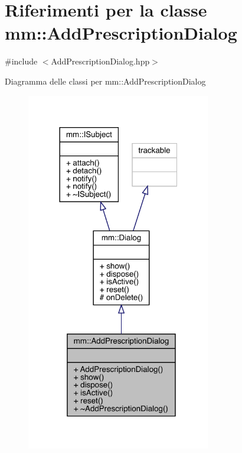 \hypertarget{classmm_1_1_add_prescription_dialog}{}\section{Riferimenti per la classe mm\+:\+:Add\+Prescription\+Dialog}
\label{classmm_1_1_add_prescription_dialog}


{\ttfamily \#include $<$Add\+Prescription\+Dialog.\+hpp$>$}



Diagramma delle classi per mm\+:\+:Add\+Prescription\+Dialog\nopagebreak
\begin{figure}[H]
\begin{center}
\leavevmode
\includegraphics[width=228pt]{d5/d29/classmm_1_1_add_prescription_dialog__inherit__graph}
\end{center}
\end{figure}


